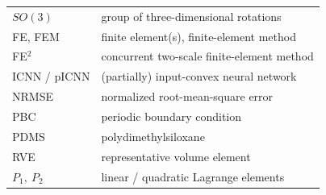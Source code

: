 \begin{longtable}{@{}p{}p{}@{}}
$SO(3)$ & group of three-dimensional rotations\\
FE, FEM & finite element(s), finite-element method\\
FE$^2$ & concurrent two-scale finite-element method\\
ICNN / pICNN & (partially) input-convex neural network\\
NRMSE & normalized root-mean-square error\\
PBC & periodic boundary condition\\
PDMS & polydimethylsiloxane\\
RVE & representative volume element\\
$P_1,\ P_2$ & linear / quadratic Lagrange elements\\
\bottomrule
\end{longtable}

